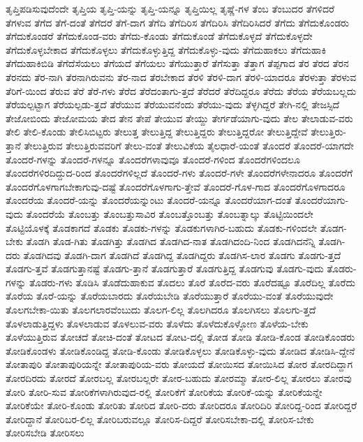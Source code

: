 {ತೃಪ್ತಿಪಡಿಸುವುದೆಂದೇ
ತೃಪ್ತಿಯ
ತೃಪ್ತಿ-ಯನ್ನು
ತೃಪ್ತಿ-ಯನ್ನೂ
ತೃಪ್ತಿಯಿಲ್ಲ
ತೃಷ್ಣೆ-ಗಳ
ತೆಂಬ
ತೆಂಬುದರ
ತೆಗಳಿದರೆ
ತೆಗಳುವ
ತೆಗೆದ
ತೆಗೆ-ದಂತೆ
ತೆಗೆದರೆ
ತೆಗೆ-ದಾಗ
ತೆಗೆದಿ
ತೆಗೆದಿರಿಸ
ತೆಗೆದಿರಿಸಿ
ತೆಗೆದಿರಿಸಿದರೆ
ತೆಗೆದು
ತೆಗೆದುಕೊಂಡರು
ತೆಗೆದುಕೊಂಡರೆ
ತೆಗೆದುಕೊಂಡ-ವರು
ತೆಗೆದು-ಕೊಂಡು
ತೆಗೆದುಕೊಂಡೆ
ತೆಗೆದುಕೊಳ್ಳದೆ
ತೆಗೆದುಕೊಳ್ಳದೇ
ತೆಗೆದುಕೊಳ್ಳಬೇಕಾದ
ತೆಗೆದುಕೊಳ್ಳಲು
ತೆಗೆದುಕೊಳ್ಳುತ್ತಿದ್ದ
ತೆಗೆದುಕೊಳ್ಳು-ವುದು
ತೆಗೆದುಹಾಕಲು
ತೆಗೆದುಹಾಕಿ
ತೆಗೆದುಹಾಕಿಬಿಡಿ
ತೆಗೆದೆಸೆಯಲು
ತೆಗೆಯದೆ
ತೆಗೆಯಲು
ತೆಗೆಯುತ್ತಾರೆ
ತೆಗೆಸುತ್ತಾ
ತೆತ್ತಾಗ
ತೆಪ್ಪಗಾದ
ತೆರ
ತೆರದ
ತೆರನ
ತೆರನದು
ತೆರ-ನಾಗಿ
ತೆರನಾಗಿರುವನು
ತೆರ-ನಾದ
ತೆರಬೇಕಾದ
ತೆರಳಿ
ತೆರಳಿ-ದಾಗ
ತೆರಳಿ-ಯಾದರೂ
ತೆರಳುತ್ತಾ
ತೆರಳುವ
ತೆರಿಗೆ-ಯಿಂದ
ತೆರುವ
ತೆರೆ
ತೆರೆ-ಗಳು
ತೆರೆದ
ತೆರೆದಂತಾಗು-ತ್ತದೆ
ತೆರೆದರೆ
ತೆರೆದಿದ್ದರೂ
ತೆರೆದು
ತೆರೆಯ
ತೆರೆಯಬಲ್ಲದು
ತೆರೆಯಲ್ಪಟ್ಟಾಗ
ತೆರೆಯಲ್ಪಡು-ತ್ತದೆ
ತೆರೆಯುವ
ತೆರೆಯುವನೆಂದು
ತೆರೆಯು-ವುದು
ತೆಳ್ಳಗಿದ್ದರೆ
ತೇಗಿ-ನಲ್ಲಿ
ತೇಜಸ್ಸಿದೆ
ತೇಜೋಬಿಂದು
ತೇಜೋಮಯ
ತೇದ
ತೇನ
ತೇಪೆ
ತೇಯುವ
ತೇಯ್ದು
ತೇರ್ಗಡೆಯಾಗು-ವುದು
ತೇಲ
ತೇಲಾಡುವ-ವರು
ತೇಲಿ
ತೇಲಿ-ಕೊಂಡು
ತೇಲಿಸಿಬಿಟ್ಟರು
ತೇಲುತ್ತ
ತೇಲುತ್ತಿದ್ದ
ತೇಲುತ್ತಿದ್ದರು
ತೇಲುತ್ತಿದ್ದರೋ
ತೇಲುತ್ತಿದ್ದೇವೆ
ತೇಲುತ್ತಿರು-ತ್ತಾನೆ
ತೇಲುತ್ತಿರುವ
ತೇಲುತ್ತಿರುವವರಿಗೆ
ತೇಲು-ವಂತೆ
ತೇಲುವಿಕೆಯ
ತೈಲಧಾರೆ-ಯಂತೆ
ತೊಂದರೆ
ತೊಂದರೆ-ಯಾಗದೇ
ತೊಂದರೆ-ಗಳನ್ನು
ತೊಂದರೆ-ಗಳನ್ನೂ
ತೊಂದರೆಗಳಾವುವೂ
ತೊಂದರೆ-ಗಳಿಂದ
ತೊಂದರೆಗಳಿಂದಲೂ
ತೊಂದರೆಗಳಿರದಿದ್ದುದ-ರಿಂದ
ತೊಂದರೆಗಳಿಲ್ಲದೆ
ತೊಂದರೆ-ಗಳು
ತೊಂದರೆ-ಗಳೇ
ತೊಂದರೆಗಳೇನಾದರೂ
ತೊಂದರೆಗೆ
ತೊಂದರೆಗೊಳಗಾಗಬೇಕಾಗುವು-ದಷ್ಟೆ
ತೊಂದರೆಗೊಳಗಾಗು-ತ್ತೇವೆ
ತೊಂದರೆ-ಗೊಳ-ಗಾದ
ತೊಂದರೆಗೊಳಗಾದರೂ
ತೊಂದರೆಯ
ತೊಂದರೆ-ಯನ್ನು
ತೊಂದರೆಯನ್ನುಂಟು
ತೊಂದರೆ-ಯನ್ನೂ
ತೊಂದರೆಯಾಗ-ದಂತೆ
ತೊಂದರೆಯಾಗು-ವುದು
ತೊಂದರೆಯೆ
ತೊಂಬತ್ತು
ತೊಂಬತ್ತುಸಾವಿರ
ತೊಂಬತ್ತೊಂಬತ್ತು
ತೊಂಬತ್ನಾಲ್ಕು
ತೊಟ್ಟಿಯಿಂದಲೇ
ತೊಟ್ಟಿಯೊಳಕ್ಕೆ
ತೊಡಕಾಗದೆ
ತೊಡಕು
ತೊಡಕು-ಗಳನ್ನು
ತೊಡಕುಗಳಾಗಿರ-ಬಹುದು
ತೊಡಕು-ಗಳಿಂದಲೇ
ತೊಡಗ-ಬೇಕು
ತೊಡಗಿ
ತೊಡ-ಗಿತು
ತೊಡಗಿತ್ತು
ತೊಡಗಿದ
ತೊಡಗಿದ-ನಾತ
ತೊಡಗಿದಂದಿ-ನಿಂದ
ತೊಡಗಿದನೆನ್ನಿ
ತೊಡಗಿ-ದರು
ತೊಡಗಿದವು
ತೊಡಗಿ-ದಾಗ
ತೊಡಗಿದೆ
ತೊಡಗಿದ್ದ
ತೊಡಗಿದ್ದರು
ತೊಡಗಿಸ-ಲಾರ
ತೊಡಗು
ತೊಡಗು-ತ್ತದೆ
ತೊಡಗು-ತ್ತವೆ
ತೊಡಗುತ್ತಾನಷ್ಟೆ
ತೊಡಗು-ತ್ತಾನೆ
ತೊಡಗುತ್ತಾರೆ
ತೊಡಗುತ್ತಿದ್ದ
ತೊಡಗುವು
ತೊಡಗು-ವುದು
ತೊಡರು-ಗಳನ್ನು
ತೊಡರು-ಗಳು
ತೊಡಿಸಿ
ತೊಡೆದುಹಾಕುವ
ತೊದಲು
ತೊರೆ
ತೊರೆದ-ವರು
ತೊರೆದಷ್ಟೂ
ತೊರೆದಿಲ್ಲ
ತೊರೆದು
ತೊರೆಯ
ತೊರೆ-ಯನ್ನು
ತೊರೆಯಬಾರದು
ತೊರೆಯಬೇಡಿ
ತೊರೆಯುತ್ತಾರೆ
ತೊರೆಯು-ವಂತೆ
ತೊರೆಯುವುದೇ
ತೊಲಗಬೇಕಾ-ಯಿತು
ತೊಲಗಲಾರವೆಂಬುದು
ತೊಲಗ-ಲಿಲ್ಲ
ತೊಲಗಿದರೂ
ತೊಲಗಿಸಲು
ತೊಲಗು-ತ್ತದೆ
ತೊಳಲಾಡುತ್ತಿದ್ದಳು
ತೊಳಲಾಡುವ
ತೊಳಲುವ-ವರು
ತೊಳೆದು
ತೊಳೆದುಕೊಳ್ಳೋಣ
ತೊಳೆಯ-ಬೇಕು
ತೊಳೆಯುತ್ತಿರುವ
ತೋಚದೆ
ತೋಚಿ-ದಂತೆ
ತೋಟದ
ತೋಟ-ದಲ್ಲಿ
ತೋಡ
ತೋಡಿ
ತೋಡಿ-ಕೊಂಡ
ತೋಡಿಕೊಂಡರು
ತೋಡಿಕೊಂಡಳು
ತೋಡಿಕೊಂಡಿದ್ದ
ತೋಡಿ-ಕೊಂಡು
ತೋಡಿಕೊಳ್ಳಲು
ತೋಡಿಕೊಳ್ಳು-ವುದು
ತೋಡಿದ
ತೋಡಿಸಿ-ದ್ದೇನೆ
ತೋತಾಪುರಿ
ತೋತಾಪುರಿಯನ್ನೇ
ತೋತಾಪುರಿಯ-ವರು
ತೋಯದೆ
ತೋಯಿಸದ
ತೋಯಿಸಿದ
ತೋರ
ತೋರದಿದ್ದಾಗ
ತೋರದಿರದು
ತೋರದೆ
ತೋರಬಲ್ಲ
ತೋರಬಲ್ಲರೇ
ತೋರ-ಬಹುದು
ತೋರಮ್ಮಾ
ತೋರ-ಲಿಲ್ಲ
ತೋರಲು
ತೋರವು
ತೋರಿ
ತೋರಿ-ಸುವ
ತೋರಿಕೆಗಳಾಗಿರುವುದ-ರಲ್ಲಿ
ತೋರಿಕೆಗೆ
ತೋರಿಕೆಯ
ತೋರಿಕೆ-ಯನ್ನು
ತೋರಿಕೆಯನ್ನೇ
ತೋರಿಕೆಯೇ
ತೋರಿ-ಕೊಂಡು
ತೋರಿತು
ತೋರಿದ
ತೋರಿ-ದರು
ತೋರಿದರೂ
ತೋರಿದಿರಿ
ತೋರಿದ್ದ-ರಿಂದ
ತೋರಿದ್ದರೆ
ತೋರಿದ್ದಾನೆ
ತೋರಿಬರ-ಲಿಲ್ಲ
ತೋರಿಬರುವಲ್ಲೂ
ತೋರಿಸ-ದಿದ್ದರೆ
ತೋರಿಸಬೇಕಾ-ದಲ್ಲಿ
ತೋರಿಸ-ಬೇಕು
ತೋರಿಸಬೇಡಿ
ತೋರಿಸಲು
}
